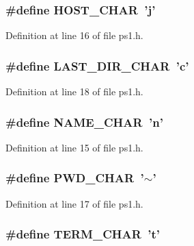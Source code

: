 \subsubsection[{H\-O\-S\-T\-\_\-\-C\-H\-A\-R}]{\setlength{\rightskip}{0pt plus 5cm}\#define H\-O\-S\-T\-\_\-\-C\-H\-A\-R~'j'}\label{ps1_8h_a942746487bf4089db1b4f2d67917c60b}


Definition at line 16 of file ps1.\-h.

\subsubsection[{L\-A\-S\-T\-\_\-\-D\-I\-R\-\_\-\-C\-H\-A\-R}]{\setlength{\rightskip}{0pt plus 5cm}\#define L\-A\-S\-T\-\_\-\-D\-I\-R\-\_\-\-C\-H\-A\-R~'c'}\label{ps1_8h_aec7445b2fb2546a315299c2c51474b57}


Definition at line 18 of file ps1.\-h.

\subsubsection[{N\-A\-M\-E\-\_\-\-C\-H\-A\-R}]{\setlength{\rightskip}{0pt plus 5cm}\#define N\-A\-M\-E\-\_\-\-C\-H\-A\-R~'n'}\label{ps1_8h_a9536f47a335bb06de4d37e9074f421c0}


Definition at line 15 of file ps1.\-h.

\subsubsection[{P\-W\-D\-\_\-\-C\-H\-A\-R}]{\setlength{\rightskip}{0pt plus 5cm}\#define P\-W\-D\-\_\-\-C\-H\-A\-R~'$\sim$'}\label{ps1_8h_a205fef933b4387df3054f5506e8cd1d1}


Definition at line 17 of file ps1.\-h.

\subsubsection[{T\-E\-R\-M\-\_\-\-C\-H\-A\-R}]{\setlength{\rightskip}{0pt plus 5cm}\#define T\-E\-R\-M\-\_\-\-C\-H\-A\-R~'t'}\label{ps1_8h_a00e4cc9bfeecc68ee12ac25bde9bd897}


